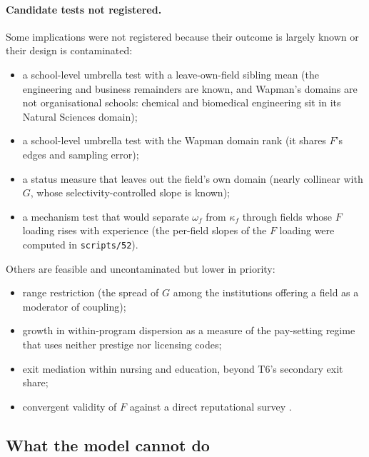 \paragraph{Candidate tests not registered.} Some implications were not registered because their outcome is largely
known or their design is contaminated:
\begin{itemize}
\item a school-level umbrella test with a leave-own-field sibling mean (the engineering and business remainders are
known, and Wapman's domains are not organisational schools: chemical and biomedical engineering sit in its Natural
Sciences domain);
\item a school-level umbrella test with the Wapman domain rank (it shares $F$'s edges and sampling error);
\item a status measure that leaves out the field's own domain (nearly collinear with $G$, whose
selectivity-controlled slope is known);
\item a mechanism test that would separate $\omega_f$ from $\kappa_f$ through fields whose $F$ loading rises with
experience (the per-field slopes of the $F$ loading were computed in \texttt{scripts/52}).
\end{itemize}
Others are feasible and uncontaminated but lower in priority:
\begin{itemize}
\item range restriction (the spread of $G$ among the institutions offering a field as a moderator of coupling);
\item growth in within-program dispersion as a measure of the pay-setting regime that uses neither prestige nor
licensing codes;
\item exit mediation within nursing and education, beyond T6's secondary exit share;
\item convergent validity of $F$ against a direct reputational survey \citep{nrc1995research}.
\end{itemize}

\subsection{What the model cannot do}\label{si:theory:limits}

